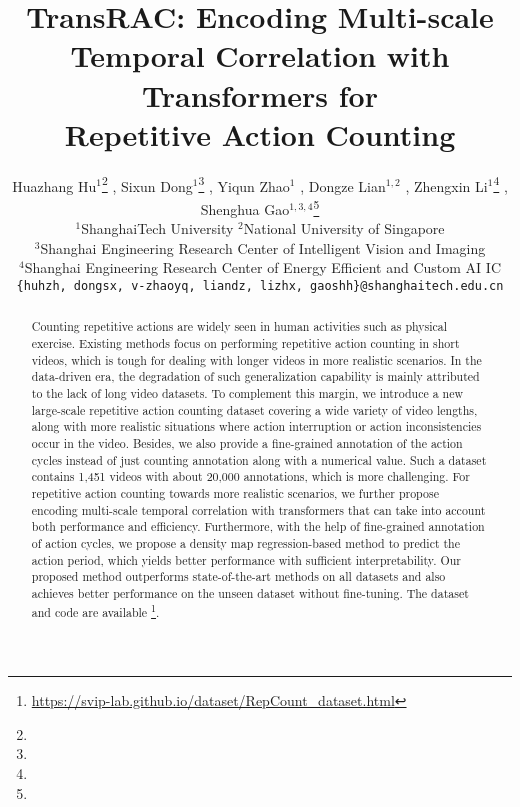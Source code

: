 \documentclass[10pt,twocolumn,letterpaper]{article}
\begin{document}
\title{TransRAC: Encoding Multi-scale Temporal Correlation with Transformers for \\
Repetitive Action  Counting}
\renewcommand{\thefootnote}{\fnsymbol{footnote}} 

\author{Huazhang Hu$^1$\footnote[1]{} ,   Sixun Dong$^1$\footnote[1]{} , Yiqun Zhao$^1$ , Dongze Lian$^{1,2}$ ,  Zhengxin Li$^1$\footnote[2]{} , Shenghua Gao$^{1,3,4}$\footnote[2]{}\\
$^1$ShanghaiTech University \qquad $^2$National University of Singapore\\
$^3$Shanghai Engineering Research Center of Intelligent Vision and Imaging\\
$^4$Shanghai Engineering Research Center of Energy Efficient and Custom AI IC\\
{\tt\small   \{huhzh, dongsx, v-zhaoyq, liandz,  lizhx, gaoshh\}@shanghaitech.edu.cn}\\
}
\maketitle

  

\renewcommand*{\thefootnote}{\arabic{footnote}}
\setcounter{footnote}{0}
\begin{abstract}
Counting repetitive actions are widely seen in human activities such as physical exercise. Existing methods focus on performing repetitive action counting in short videos, which is tough for dealing with longer videos in more realistic scenarios. In the data-driven era, the degradation of such generalization capability is mainly attributed to the lack of long video datasets. To complement this margin, we introduce a new large-scale repetitive action counting dataset covering a wide variety of video lengths, along with more realistic situations where action interruption or action inconsistencies occur in the video. Besides, we also provide a fine-grained annotation of the action cycles instead of just counting annotation along with a numerical value. 
Such a dataset contains 1,451 videos with about 20,000 annotations, which is more challenging. For repetitive action counting towards more realistic scenarios, we further propose encoding multi-scale temporal correlation with transformers that can take into account both performance and efficiency. Furthermore, with the help of fine-grained annotation of action cycles, we propose a density map regression-based method to predict the action period, which yields better performance with sufficient interpretability. Our proposed method outperforms state-of-the-art methods on all datasets and also achieves better performance on the unseen dataset without fine-tuning. The dataset and code are available \footnote{\url{https://svip-lab.github.io/dataset/RepCount_dataset.html}}.
\end{abstract}
\end{document}
